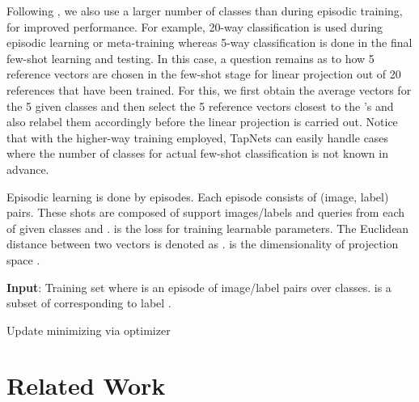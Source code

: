 \documentclass{article}
\begin{document}
Following \cite{PN}, we also use a larger number of classes than  during episodic training, for improved performance. For example, 20-way classification is used during episodic learning or meta-training whereas 5-way classification is done in the final few-shot learning and testing. In this case, a question remains as to how 
5 reference vectors are chosen in the few-shot stage for linear projection out of 20 references that have been trained. For this, we first obtain 
the average vectors  for the 5 given classes and then select the 5 reference vectors closest to the 's and also relabel them accordingly before the linear projection is carried out. Notice that with the higher-way training employed, TapNets can easily handle cases where the number of classes for actual few-shot classification is not known in advance.





\begin{algorithm*}[h]
	\caption{Episodic learning is done by  episodes. Each episode  consists of  (image, label) pairs. These  shots are composed of  support images/labels and  queries from each of  given classes and .  is the loss for training learnable parameters. The Euclidean distance between two vectors is denoted as .  is the dimensionality of projection space .}
	\label{alg}
	\textbf{Input}: Training set  where  is an episode of  image/label pairs over  classes.  is a subset of  corresponding to label .
	\begin{algorithmic}[1]
		\STATE 
		
\STATE 
		\STATE 
		
		\ENDFOR
		\STATE 
\STATE 
		\ENDFOR
		\ENDFOR
		\STATE Update  minimizing  via optimizer
		\ENDFOR
	\end{algorithmic}
\end{algorithm*}


\section{Related Work}
\end{document}
